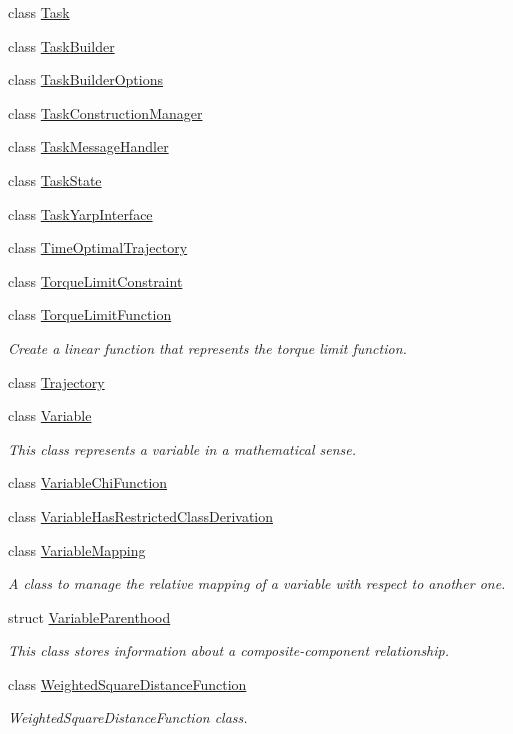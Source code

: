 \begin{DoxyCompactItemize}
class \hyperlink{classocra_1_1Task}{Task}
\item 
class \hyperlink{classocra_1_1TaskBuilder}{Task\+Builder}
\item 
class \hyperlink{classocra_1_1TaskBuilderOptions}{Task\+Builder\+Options}
\item 
class \hyperlink{classocra_1_1TaskConstructionManager}{Task\+Construction\+Manager}
\item 
class \hyperlink{classocra_1_1TaskMessageHandler}{Task\+Message\+Handler}
\item 
class \hyperlink{classocra_1_1TaskState}{Task\+State}
\item 
class \hyperlink{classocra_1_1TaskYarpInterface}{Task\+Yarp\+Interface}
\item 
class \hyperlink{classocra_1_1TimeOptimalTrajectory}{Time\+Optimal\+Trajectory}
\item 
class \hyperlink{classocra_1_1TorqueLimitConstraint}{Torque\+Limit\+Constraint}
\item 
class \hyperlink{classocra_1_1TorqueLimitFunction}{Torque\+Limit\+Function}
\begin{DoxyCompactList}\small\item\em Create a linear function that represents the torque limit function. \end{DoxyCompactList}\item 
class \hyperlink{classocra_1_1Trajectory}{Trajectory}
\item 
class \hyperlink{classocra_1_1Variable}{Variable}
\begin{DoxyCompactList}\small\item\em This class represents a variable in a mathematical sense. \end{DoxyCompactList}\item 
class \hyperlink{classocra_1_1VariableChiFunction}{Variable\+Chi\+Function}
\item 
class \hyperlink{classocra_1_1VariableHasRestrictedClassDerivation}{Variable\+Has\+Restricted\+Class\+Derivation}
\item 
class \hyperlink{classocra_1_1VariableMapping}{Variable\+Mapping}
\begin{DoxyCompactList}\small\item\em A class to manage the relative mapping of a variable with respect to another one. \end{DoxyCompactList}\item 
struct \hyperlink{structocra_1_1VariableParenthood}{Variable\+Parenthood}
\begin{DoxyCompactList}\small\item\em This class stores information about a composite-\/component relationship. \end{DoxyCompactList}\item 
class \hyperlink{classocra_1_1WeightedSquareDistanceFunction}{Weighted\+Square\+Distance\+Function}
\begin{DoxyCompactList}\small\item\em Weighted\+Square\+Distance\+Function class. \end{DoxyCompactList}\end{DoxyCompactItemize}
